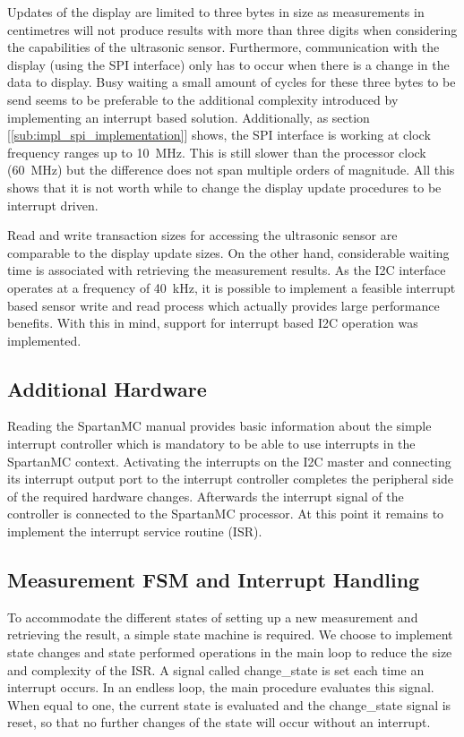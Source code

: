 			Updates of the display are limited to three bytes in size as measurements in centimetres will not produce results with more than three digits when considering the capabilities of the ultrasonic sensor. Furthermore, communication with the display (using the SPI interface) only has to occur when there is a change in the data to display. Busy waiting a small amount of cycles for these three bytes to be send seems to be preferable to the additional complexity introduced by implementing an interrupt based solution. Additionally, as section [\ref{sub:impl_spi_implementation}] shows, the SPI interface is working at clock frequency ranges up to \SI{10}{\mega\hertz}. This is still slower than the processor clock (\SI{60}{\mega\hertz}) but the difference does not span multiple orders of magnitude. 
			All this shows that it is not worth while to change the display update procedures to be interrupt driven.

			Read and write transaction sizes for accessing the ultrasonic sensor are comparable to the display update sizes. On the other hand, considerable waiting time is associated with retrieving the measurement results. As the I2C interface operates at a frequency of \SI{40}{\kilo\hertz}, it is possible to implement a feasible interrupt based sensor write and read process which actually provides large performance benefits. With this in mind, support for interrupt based I2C operation was implemented.

		\subsection{Additional Hardware} %
		\label{sub:additional_hardware}
			Reading the SpartanMC manual provides basic information about the simple interrupt controller which is mandatory to be able to use interrupts in the SpartanMC context. Activating the interrupts on the I2C master and connecting its interrupt output port to the interrupt controller completes the peripheral side of the required hardware changes. Afterwards the interrupt signal of the controller is connected to the SpartanMC processor. At this point it remains to implement the interrupt service routine (ISR).

		\subsection{Measurement FSM and Interrupt Handling} %
		\label{sub:measurement_fsm_and_interrupt_handling}
			To accommodate the different states of setting up a new measurement and retrieving the result, a simple state machine is required. We choose to implement state changes and state performed operations in the main loop to reduce the size and complexity of the ISR.
			A signal called change\_state is set each time an interrupt occurs. In an endless loop, the main procedure evaluates this signal. When equal to one, the current state is evaluated and the change\_state signal is reset, so that no further changes of the state will occur without an interrupt.

